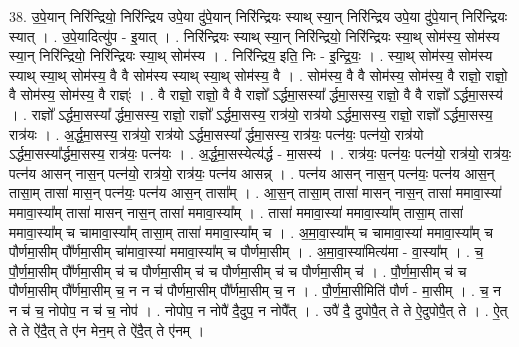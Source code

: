 \documentclass[17pt]{extarticle}
\begin{document}
38. उ॒पे॒यान् निरि॑न्द्रियो॒ निरि॑न्द्रिय उपे॒या दु॑पे॒यान् निरि॑न्द्रियः स्याथ् स्या॒न् निरि॑न्द्रिय उपे॒या दु॑पे॒यान् निरि॑न्द्रियः स्यात् । . उ॒पे॒यादित्यु॑प - इ॒यात् । . निरि॑न्द्रियः स्याथ् स्या॒न् निरि॑न्द्रियो॒ निरि॑न्द्रियः स्या॒थ् सोम॑स्य॒ सोम॑स्य स्या॒न् निरि॑न्द्रियो॒ निरि॑न्द्रियः स्या॒थ् सोम॑स्य । . निरि॑न्द्रिय॒ इति॒ निः - इ॒न्द्रि॒यः॒ । . स्या॒थ् सोम॑स्य॒ सोम॑स्य स्याथ् स्या॒थ् सोम॑स्य॒ वै वै सोम॑स्य स्याथ् स्या॒थ् सोम॑स्य॒ वै । . सोम॑स्य॒ वै वै सोम॑स्य॒ सोम॑स्य॒ वै राज्ञो॒ राज्ञो॒ वै सोम॑स्य॒ सोम॑स्य॒ वै राज्ञ्ः॑ । . वै राज्ञो॒ राज्ञो॒ वै वै राज्ञो᳚ ऽर्द्धमा॒सस्या᳚ र्द्धमा॒सस्य॒ राज्ञो॒ वै वै राज्ञो᳚ ऽर्द्धमा॒सस्य॑ । . राज्ञो᳚ ऽर्द्धमा॒सस्या᳚ र्द्धमा॒सस्य॒ राज्ञो॒ राज्ञो᳚ ऽर्द्धमा॒सस्य॒ रात्र॑यो॒ रात्र॑यो ऽर्द्धमा॒सस्य॒ राज्ञो॒ राज्ञो᳚ ऽर्द्धमा॒सस्य॒ रात्र॑यः । . अ॒र्द्ध॒मा॒सस्य॒ रात्र॑यो॒ रात्र॑यो ऽर्द्धमा॒सस्या᳚ र्द्धमा॒सस्य॒ रात्र॑यः॒ पत्न॑यः॒ पत्न॑यो॒ रात्र॑यो ऽर्द्धमा॒सस्या᳚र्द्धमा॒सस्य॒ रात्र॑यः॒ पत्न॑यः । . अ॒र्द्ध॒मा॒सस्येत्य॑र्द्ध - मा॒सस्य॑ । . रात्र॑यः॒ पत्न॑यः॒ पत्न॑यो॒ रात्र॑यो॒ रात्र॑यः॒ पत्न॑य आसन् नास॒न् पत्न॑यो॒ रात्र॑यो॒ रात्र॑यः॒ पत्न॑य आसन्न् । . पत्न॑य आसन् नास॒न् पत्न॑यः॒ पत्न॑य आस॒न् तासा॒म् तासा॑ मास॒न् पत्न॑यः॒ पत्न॑य आस॒न् तासा᳚म् । . आ॒स॒न् तासा॒म् तासा॑ मासन् नास॒न् तासा॑ ममावा॒स्या॑ ममावा॒स्या᳚म् तासा॑ मासन् नास॒न् तासा॑ ममावा॒स्या᳚म् । . तासा॑ ममावा॒स्या॑ ममावा॒स्या᳚म् तासा॒म् तासा॑ ममावा॒स्या᳚म् च चामावा॒स्या᳚म् तासा॒म् तासा॑ ममावा॒स्या᳚म् च । . अ॒मा॒वा॒स्या᳚म् च चामावा॒स्या॑ ममावा॒स्या᳚म् च पौर्णमा॒सीम् पौ᳚र्णमा॒सीम् चा॑मावा॒स्या॑ ममावा॒स्या᳚म् च पौर्णमा॒सीम् । . अ॒मा॒वा॒स्या॑मित्य॑मा - वा॒स्या᳚म् । . च॒ पौ॒र्ण॒मा॒सीम् पौ᳚र्णमा॒सीम् च॑ च पौर्णमा॒सीम् च॑ च पौर्णमा॒सीम् च॑ च पौर्णमा॒सीम् च॑ । . पौ॒र्ण॒मा॒सीम् च॑ च पौर्णमा॒सीम् पौ᳚र्णमा॒सीम् च॒ न न च॑ पौर्णमा॒सीम् पौ᳚र्णमा॒सीम् च॒ न । . पौ॒र्ण॒मा॒सीमिति॑ पौर्ण - मा॒सीम् । . च॒ न न च॑ च॒ नोपोप॒ न च॑ च॒ नोप॑ । . नोपोप॒ न नोपै॑ दै॒दुप॒ न नोपै᳚त् । . उपै॑ दै॒ दुपोपै॒त् ते ते ऐ॒दुपोपै॒त् ते । . ऐ॒त् ते ते ऐ॑दै॒त् ते ए॑न मेन॒म् ते ऐ॑दै॒त् ते ए॑नम् । \newline
\pagebreak
{}
\end{document}
